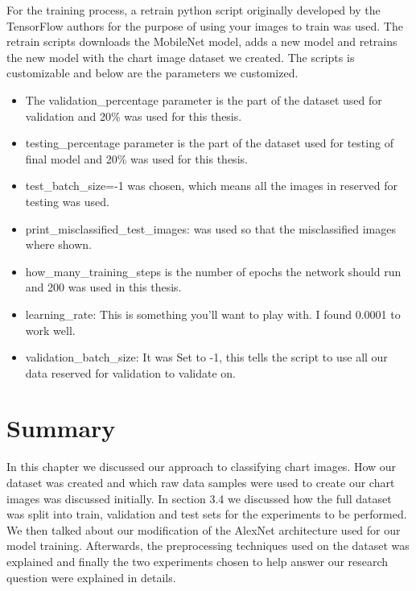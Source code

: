 \documentclass[12pt, a4paper,oneside]{report}
\begin{document}
For the training process, a retrain python script originally developed by the TensorFlow authors for the purpose of using your images to train was used. The retrain scripts downloads the MobileNet model, adds a new model and retrains the new model with the chart image dataset we created. The scripts is customizable and below are the parameters we customized.

\begin{itemize}
	
	\item The validation\_percentage parameter is the part of the dataset used for validation and 20\% was used for this thesis.
	
	\item testing\_percentage parameter is the part of the dataset used for testing of final model and 20\% was used for this thesis.
	
	\item test\_batch\_size=-1 was chosen, which means all the images in reserved for testing was used.
	
	\item print\_misclassified\_test\_images:  was used so that the misclassified images where shown.
	
	\item how\_many\_training\_steps is the number of epochs the network should run and 200 was used in this thesis.
	
	\item learning\_rate: This is something you’ll want to play with. I found 0.0001 to work well.
	
	\item validation\_batch\_size: It was Set to -1, this tells the script to use all our data reserved for validation to validate on.
\end{itemize}

\section{Summary}
In this chapter we discussed our approach to classifying chart images. How our dataset was created and which raw data samples were used to create our chart images was discussed initially. In section 3.4 we discussed how the full dataset was split into train, validation and test sets for the experiments to be performed. We then talked about our modification of the AlexNet architecture used for our model training. Afterwards, the preprocessing techniques used on the dataset was explained and finally the two experiments chosen to help answer our research question were explained in details.
\end{document}
